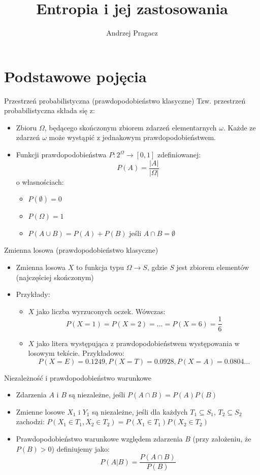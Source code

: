 \documentclass{beamer}
\title{Entropia i jej zastosowania}
\author{Andrzej Pragacz}
\begin{document}
\titlepage

\section{Podstawowe pojęcia}

\begin{frame}{Przestrzeń probabilistyczna (prawdopodobieństwo klasyczne)}
Tzw. przestrzeń probabilistyczna składa się z:
\begin{itemize}
  \item Zbioru $\Omega$, będącego skończonym zbiorem zdarzeń
  elementarnych $\omega$. Każde ze zdarzeń $\omega$ może wystąpić z jednakowym
  prawdopodobieństwem.
  \item Funkcji prawdopodobieństwa $P: 2^\Omega \to [0, 1]$ zdefiniowanej:
  $$
  P(A) = \frac{|A|}{|\Omega|}
  $$
  o własnościach:
  \begin{itemize}
    \item $P(\emptyset) = 0$
    \item $P(\Omega) = 1$
    \item $P(A \cup B) = P(A) + P(B)$ jeśli $A \cap B = \emptyset$
  \end{itemize}
\end{itemize}
\end{frame}

\begin{frame}{Zmienna losowa (prawdopodobieństwo klasyczne)}
\begin{itemize}
  \item Zmienna losowa $X$ to funkcja typu $\Omega \to S$, gdzie $S$ jest
  zbiorem elementów (najczęściej skończonym)
  \item Przykłady:
  \begin{itemize}
    \item $X$ jako liczba wyrzuconych oczek. Wówczas: $$P(X=1) = P(X=2) = \ldots = P(X=6) = \frac{1}{6}$$
    \item $X$ jako litera występująca z prawdopodobieństwem występowania
    w losowym tekście. Przykładowo:
    $$ P(X=E) = 0.1249, P(X=T) = 0.0928, P(X=A) = 0.0804 \ldots$$
  \end{itemize}
\end{itemize}
\end{frame}

\begin{frame}{Niezależność i prawdopodobieństwo warunkowe}
\begin{itemize}
  \item Zdarzenia $A$ i $B$ są niezależne, jeśli $P(A \cap B) = P(A) P(B)$
  \item Zmienne losowe $X_1$ i $Y_1$ są niezależne, jeśli dla każdych
  $T_1 \subseteq S_1$, $T_2 \subseteq S_2$ zachodzi:
  $P(X_1 \in T_1, X_2 \in T_2) = P(X_1 \in T_1) P(X_2 \in T_2)$
  \item Prawdopodobieństwo warunkowe względem zdarzenia $B$
  (przy założeniu, że $P(B) > 0$) definiujemy jako:
  $$
  P(A|B) = \frac{P(A \cap B)}{P(B)}
  $$
\end{itemize}
\end{frame}
\end{document}
